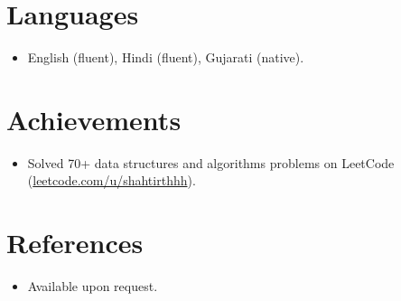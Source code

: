\documentclass[11pt,a4paper,sans]{moderncv}
\begin{document}
\section{Languages}
\vspace{1pt}
\begin{itemize}
\item English (fluent), Hindi (fluent), Gujarati (native).
\end{itemize}


\section{Achievements}
\vspace{1pt}
\begin{itemize}
\item Solved 70+ data structures and algorithms problems on LeetCode (\href{https://leetcode.com/u/shahtirthhh}{leetcode.com/u/shahtirthhh}).
\end{itemize}


\section{References}
\vspace{1pt}
\begin{itemize}
\item{Available upon request.}
\end{itemize}
\end{document}
